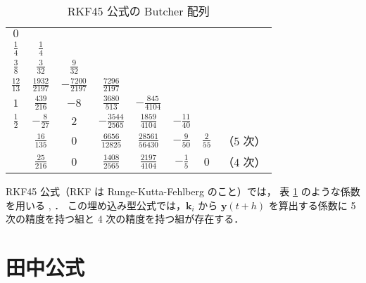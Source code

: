 \begin{table}[bp]
    \caption{RKF45 公式の Butcher 配列}
    \label{table:ode_runge-kutta_butcher-array-rkf45}
    \centering
    \begin{tabular}{c|ccccccc}
        $0$             &                     &                      &                      &                       &                  &                &          \\
        $\frac{1}{4}$   & $\frac{1}{4}$       &                      &                      &                       &                  &                &          \\
        $\frac{3}{8}$   & $\frac{3}{32}$      & $\frac{9}{32}$       &                      &                       &                  &                &          \\
        $\frac{12}{13}$ & $\frac{1932}{2197}$ & $-\frac{7200}{2197}$ & $\frac{7296}{2197}$  &                       &                  &                &          \\
        $1$             & $\frac{439}{216}$   & $-8$                 & $\frac{3680}{513}$   & $-\frac{845}{4104}$   &                  &                &          \\
        $\frac{1}{2}$   & $-\frac{8}{27}$     & $2$                  & $-\frac{3544}{2565}$ & $\frac{1859}{4104}$   & $-\frac{11}{40}$ &                &          \\
        \hline
                        & $\frac{16}{135}$    & $0$                  & $\frac{6656}{12825}$ & $\frac{28561}{56430}$ & $-\frac{9}{50}$  & $\frac{2}{55}$ & （5 次） \\
                        & $\frac{25}{216}$    & $0$                  & $\frac{1408}{2565}$  & $\frac{2197}{4104}$   & $-\frac{1}{5}$   & $0$            & （4 次）
    \end{tabular}
\end{table}

RKF45 公式（RKF は Runge-Kutta-Fehlberg のこと）では，
表 \ref{table:ode_runge-kutta_butcher-array-rkf45} のような係数を用いる
\cite[4.1 節 (a)]{Mitsui1993}, \cite[Section 9.5]{Mathews2004}．
この埋め込み型公式では，$\bm{k}_i$ から $\bm{y}(t + h)$ を算出する係数に
5 次の精度を持つ組と 4 次の精度を持つ組が存在する．

\section{田中公式}

